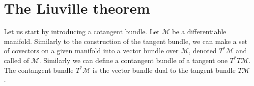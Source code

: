 


\section{The Liuville theorem}

Let us start by introducing a cotangent bundle. 
Let $\mathcal{M}$ be a differentiable manifold. 
Similarly to the construction of the tangent bundle, we can make a set of covectors on a given manifold 
into a vector bundle over $\mathcal{M}$, denoted $T^*\mathcal{M}$ and called  of $\mathcal{M}$.  
Similarly we can define a contangent bundle of a tangent one $T^*T\mathcal{M}$. 
The contangent bundle $T^*\mathcal{M}$ is the vector bundle dual to the tangent bundle $T\mathcal{M}$. 

